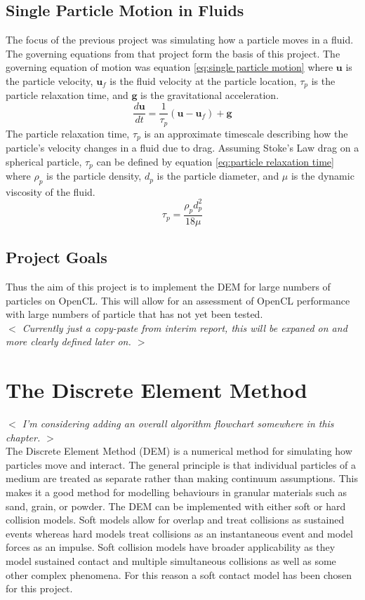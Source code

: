 \documentclass[10pt,a4paper,titlepage]{report}
\begin{document}
\section{Single Particle Motion in Fluids}
\label{sec:Single Particle Motion in Fluids}
The focus of the previous project was simulating how a particle moves in a fluid. The governing equations from that project form the basis of this project. The governing equation of motion was equation \ref{eq:single particle motion} where $\mathbf{u}$ is the particle velocity, $\mathbf{u}_f$ is the fluid velocity at the particle location, $\tau_p$ is the particle relaxation time, and $\mathbf{g}$ is the gravitational acceleration.
\begin{equation}
\label{eq:single particle motion}
\dfrac{d\mathbf{u}}{dt} = \dfrac{1}{\tau_p}(\mathbf{u} - \mathbf{u}_f) + \mathbf{g}
\end{equation}
The particle relaxation time, $\tau_p$ is an approximate timescale describing how the particle's velocity changes in a fluid due to drag. Assuming Stoke's Law drag on a spherical particle, $\tau_p$ can be defined by equation \ref{eq:particle relaxation time} where $\rho_p$ is the particle density, $d_p$ is the particle diameter, and $\mu$ is the dynamic viscosity of the fluid.
\begin{equation}
\label{eq:particle relaxation time}
\tau_{p} = \dfrac{\rho_{p} d^{2}_{p}}{18 \mu}
\end{equation}
\section{Project Goals}
Thus the aim of this project is to implement the DEM for large numbers of particles on OpenCL. This will allow for an assessment of OpenCL performance with large numbers of particle that has not yet been tested.
\\\textit{$<$ Currently just a copy-paste from interim report, this will be expaned on and more clearly defined later on. $>$}
\chapter{The Discrete Element Method}
\textit{$<$ I'm considering adding an overall algorithm flowchart somewhere in this chapter. $>$}
\\The Discrete Element Method (DEM) is a numerical method for simulating how particles move and interact. The general principle is that individual particles of a medium are treated as separate rather than making continuum assumptions. This makes it a good method for modelling behaviours in granular materials such as sand, grain, or powder. The DEM can be implemented with either soft or hard collision models. Soft models allow for overlap and treat collisions as sustained events whereas hard models treat collisions as an instantaneous event and model forces as an impulse. Soft collision models have broader applicability as they model sustained contact and multiple simultaneous collisions as well as some other complex phenomena\cite{softvshard}. For this reason a soft contact model has been chosen for this project.
\end{document}
